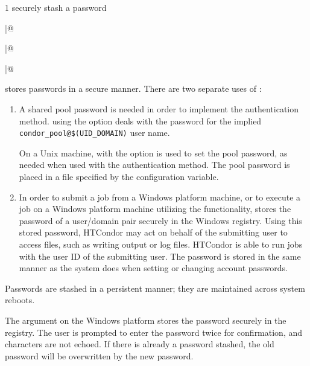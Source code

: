 \begin{ManPage}{\label{man-condor-store-cred}}{1}
{securely stash a password}
\Synopsis
{}

\Lbr
{} \verb@|@ 
\Rbr 
{}

\Lbr
{} \verb@|@ 
\Rbr 
{}

\Lbr
{} \verb@|@ 
\Rbr 
{}


\Description 

 stores passwords in a secure manner.
There are two separate uses of :
\begin{enumerate}
\item A shared pool password is needed in order to implement the 
 authentication method.
 using the  option deals with the
password for the implied \verb|condor_pool@$(UID_DOMAIN)| user name.

On a Unix machine, 
 with the  option is used to set
the pool password,
as needed when used with the  authentication method.
The pool password is placed in a file specified by 
the  configuration variable.

\item In order to submit a job from a Windows platform machine,
or to execute a job on a Windows platform machine utilizing the
 functionality, 
 stores the password
of a user/domain pair securely in the Windows registry.
Using this stored password, 
HTCondor may act on behalf of the submitting user to access files,
such as writing output or log files. 
HTCondor is able to
run jobs with the user ID of the submitting user.
The password is stored in the same manner as the system does when
setting or changing account passwords.
\end{enumerate}

Passwords are stashed in a persistent manner; they are maintained
across system reboots.

The  argument on the Windows platform 
stores the password securely in the registry.
The user is prompted to enter the password twice for confirmation, 
and characters are not echoed.
If there is already a password stashed,
the old password will be overwritten by the new password.


\end{ManPage}
